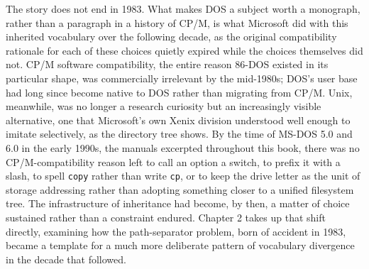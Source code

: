\documentclass[11pt]{book}
\begin{document}
The story does not end in 1983. What makes DOS a subject worth a monograph, rather than a paragraph in a history of CP/M, is what Microsoft did with this inherited vocabulary over the following decade, as the original compatibility rationale for each of these choices quietly expired while the choices themselves did not. CP/M software compatibility, the entire reason 86-DOS existed in its particular shape, was commercially irrelevant by the mid-1980s; DOS's user base had long since become native to DOS rather than migrating from CP/M. Unix, meanwhile, was no longer a research curiosity but an increasingly visible alternative, one that Microsoft's own Xenix division understood well enough to imitate selectively, as the directory tree shows. By the time of MS-DOS 5.0 and 6.0 in the early 1990s, the manuals excerpted throughout this book, there was no CP/M-compatibility reason left to call an option a switch, to prefix it with a slash, to spell \texttt{copy} rather than write \texttt{cp}, or to keep the drive letter as the unit of storage addressing rather than adopting something closer to a unified filesystem tree. The infrastructure of inheritance had become, by then, a matter of choice sustained rather than a constraint endured. Chapter 2 takes up that shift directly, examining how the path-separator problem, born of accident in 1983, became a template for a much more deliberate pattern of vocabulary divergence in the decade that followed.
\end{document}
